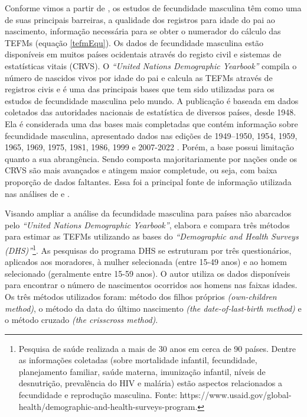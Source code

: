 Conforme vimos a partir de , os estudos de fecundidade masculina têm como uma de suas principais barreiras, a qualidade dos registros para idade do pai ao nascimento, informação necessária para se obter o numerador do cálculo das TEFMs (equação \ref{tefmEqu}). Os dados de fecundidade masculina estão disponíveis em muitos países ocidentais através do registo civil e sistemas de estatísticas vitais (CRVS). O \textit{“United Nations Demographic Yearbook”} compila o número de nascidos vivos por idade do pai e calcula as TEFMs através de registros civis e é uma das principais bases que tem sido utilizadas para os estudos de fecundidade masculina pelo mundo. A publicação é baseada em dados coletados das autoridades nacionais de estatística de diversos países, desde 1948. Ela é considerada uma das bases mais completadas que contém informação sobre fecundidade masculina, apresentado dados nas edições de 1949–1950, 1954, 1959, 1965, 1969, 1975, 1981, 1986, 1999 e 2007-2022 \cite{unstatsu25:online}. Porém, a base possui limitação quanto a sua abrangência. Sendo composta majoritariamente por nações onde os CRVS são mais avançados \cite{zhang2010male} e atingem maior completude, ou seja, com baixa proporção de dados faltantes. Essa foi a principal fonte de informação utilizada nas análises de  e . 

Visando ampliar a análise da fecundidade masculina para países não abarcados pelo \textit{“United Nations Demographic Yearbook”},  elabora e compara três métodos para estimar as TEFMs utilizando as bases do \textit{“Demographic and Health Surveys (DHS)”}\footnote{Pesquisa de saúde realizada a mais de 30 anos em cerca de 90 países. Dentre as informações coletadas (sobre mortalidade infantil, fecundidade, planejamento familiar, saúde materna, imunização infantil, níveis de desnutrição, prevalência do HIV e malária) estão aspectos relacionados a fecundidade e reprodução masculina. Fonte: https://www.usaid.gov/global-health/demographic-and-health-surveys-program.}. As pesquisas do programa DHS se estruturam por três questionários, aplicados aos moradores, à mulher selecionada (entre 15-49 anos) e ao homem selecionado (geralmente entre 15-59 anos). O autor utiliza os dados disponíveis para encontrar o número de nascimentos ocorridos aos homens nas faixas idades. Os três métodos utilizados foram: método dos filhos próprios \textit{(own-children method)}, o método da data do último nascimento \textit{(the date-of-last-birth method)} e o método cruzado \textit{(the crisscross method)}.



